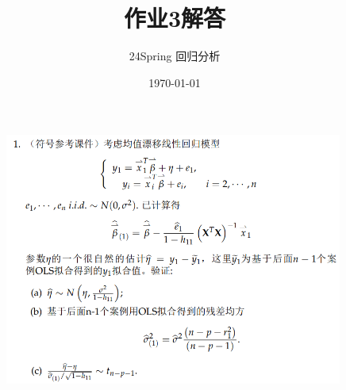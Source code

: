 \documentclass[cn,hazy,green,12pt,normal]{elegantnote}
\title{作业3解答}
\author{24Spring 回归分析}
\date{\today}
\numberwithin{equation}{section}
\numberwithin{subsection}{section}
\begin{document}
\maketitle
\begin{homework}
\end{homework}
    \begin{figure}[!htbp]
        \centering
        \includegraphics[width=30em]{image/hw3_plt1.png}
    \end{figure}
\end{document}
